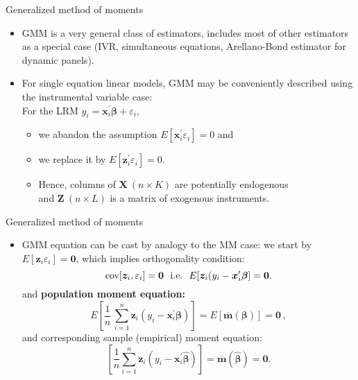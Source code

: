 \documentclass{beamer}
\begin{document}
\begin{frame}{Generalized method of moments}
\begin{itemize}
    \item GMM is a very general class of estimators, includes most of other estimators as a special case (IVR, simultaneous equations, Arellano-Bond estimator for dynamic panels). 
    \medskip
    \item For single equation linear models, GMM may be conveniently described using the instrumental variable case:\\ \bigskip For the LRM $y_i = \bm{x}_i^{\prime}\bm{\beta} + \varepsilon_i$, 
    \begin{itemize}
    \medskip
        \item  we abandon the assumption $E[\bm{x}_i^{\prime} \varepsilon_i]=0$ and
        \medskip
        \item we replace it by $E[\bm{z}_i^{\prime} \varepsilon_i]=0$.
        \medskip
        \item Hence, columns of $\bm{X}~(n\!\times\!K)$ are potentially endogenous \\ \medskip and $\bm{Z}~(n\!\times\!L)$ is a matrix of exogenous instruments.
    \end{itemize}
\end{itemize}
\end{frame}
\begin{frame}{Generalized method of moments}

\begin{itemize}
\item GMM equation can be cast by analogy to the MM case: we start by $E[\bm{z}_i \varepsilon_i]=\bm{0}$, which implies orthogonality condition: $$\textnormal{cov}[\bm{z}_i, \varepsilon_i] = \bm{0} \textnormal{~~i.e.~~}E[\bm{z}_i(y_i-\bm{x}_i^{\prime}\bm{\beta}]=\bm{0}.$$ 
and \textbf{population moment equation:}
$$
E \left[ \frac{1}{n} \, \sum_{i=1}^n \bm{z}_i (y_i - \bm{x}_i^{\prime}\bm{\beta}) \right] 
= E \left[ \overline{\mathbf{m}}(\bm{\beta}) \right] = \bm{0}\,,
$$
and corresponding sample (empirical) moment equation:
$$
\left[ \frac{1}{n} \sum_{i=1}^n \bm{z}_i (y_i - \bm{x}_i^{\prime}\hat{\bm{\beta}}) \right]
= \overline{\mathbf{m}}(\hat{\bm{\beta}}) = \bm{0}.
$$
\end{itemize}

\end{frame}
\end{document}
